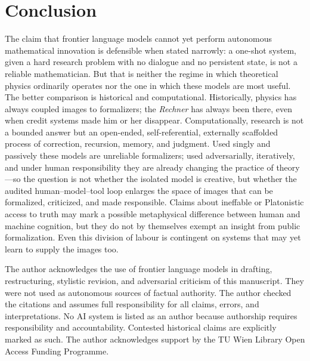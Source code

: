 \documentclass[
  aps,
  reprint,
  superscriptaddress,
  floatfix,
  nofootinbib,
  longbibliography
]{revtex4-2}
\begin{document}
\section{Conclusion}
\label{sec:conclusion}

The claim that frontier language models cannot yet perform autonomous
mathematical innovation is defensible when stated narrowly: a one-shot system,
given a hard research problem with no dialogue and no persistent state, is not a
reliable mathematician. But that is neither the regime in which theoretical
physics ordinarily operates nor the one in which these models are most useful.
The better comparison is historical and computational. Historically, physics has
always coupled images to formalizers; the \emph{Rechner} has always been there,
even when credit systems made him or her disappear. Computationally, research is
not a bounded answer but an open-ended, self-referential, externally scaffolded
process of correction, recursion, memory, and judgment. Used singly and passively
these models are unreliable formalizers; used adversarially, iteratively, and
under human responsibility they are already changing the practice of theory---so
the question is not whether the isolated model is creative, but whether the
audited human--model--tool loop enlarges the space of images that can be
formalized, criticized, and made responsible. Claims about ineffable or
Platonistic access to truth may mark a possible metaphysical difference between
human and machine cognition, but they do not by themselves exempt an insight
from public formalization. Even this division of labour is contingent on systems
that may yet learn to supply the images too.

\begin{acknowledgments}
The author acknowledges the use of frontier language models in drafting,
restructuring, stylistic revision, and adversarial criticism of this manuscript.
They were not used as autonomous sources of factual authority. The author checked
the citations and assumes full responsibility for all claims, errors, and
interpretations. No AI system is listed as an author because authorship requires
responsibility and accountability. Contested historical claims are explicitly
marked as such. The author acknowledges support by the TU Wien Library Open Access
Funding Programme.
\end{acknowledgments}


\end{document}
